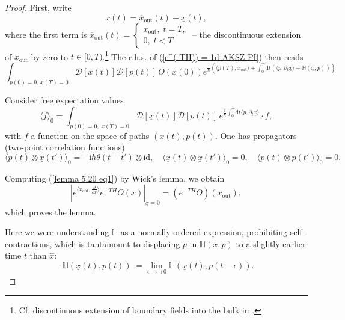 \documentclass{amsart}
\theoremstyle{plain} %
\theoremstyle{definition}
\theoremstyle{remark}
\newcommand{\mc}{\mathcal}
\newcommand{\mr}{\mathrm}
\newcommand{\ra}{\rightarrow}
\newcommand{\wh}{\widehat}
\newcommand{\dd}{\partial}
\newcommand{\iii}{\mathrm{i}}
\newcommand{\ol}{\overline}
\newcommand{\xx}{\underline{x}}
\newcommand{\dr}{\mathrm{d}}
\begin{document}
\begin{proof}
First, write 
\begin{equation}\label{x=xout+xhat}
x(t)=\ol{x}_\mr{out}(t)+\xx(t),
\end{equation}
where the first term is 
$\ol{x}_\mr{out}(t)=\begin{cases}
    x_\mr{out},\; t=T,\\
    0,\; t<T
\end{cases}$
-- the discontinuous extension of $x_\mr{out}$ by zero to $t\in [0,T)$.\footnote{Cf. discontinuous extension of boundary fields into the bulk in \cite[Section 2.4]{CMRpert}.
} The r.h.s. of (\ref{e^(-TH)) = 1d AKSZ PI}) then reads
\begin{equation}\label{lemma 5.20 eq1}
    \int_{p(0)=0, \, \xx(T)=0} \mc{D} [\xx(t)] \mc{D} [p(t)]\, O(\xx(0)) e^{\frac{\iii}{\hbar} \left(\langle p(T),x_\mr{out} \rangle+\int_0^T \dr t \left(\langle p,\dd_t \xx \rangle-\mathbb{H}(\xx,p)\right) \right)}
\end{equation}

Consider free expectation values 
\begin{equation}
        \langle f \rangle_0 = \int_{p(0)=0,\; \xx(T)=0} 
        \mc{D} [\xx(t)] \mc{D} [p(t)]\, e^{\frac{\iii}{\hbar}\int_0^T \dr t \langle p, \dd_t \xx\rangle}\cdot f,
\end{equation}
with $f$ a function on the space of paths $(\xx(t),p(t))$. %
One has propagators (two-point correlation functions)
\begin{equation}
        \langle p(t)\otimes \xx(t') \rangle_0=-\iii\hbar \theta(t-t')\otimes\mr{id},\quad
        \langle \xx(t)\otimes \xx(t')\rangle_0 = 0,\quad
        \langle p(t)\otimes p(t')\rangle_0 =0.
\end{equation}

Computing (\ref{lemma 5.20 eq1}) by Wick's lemma, we obtain
\begin{equation}
    \left| e^{\langle x_\mr{out}, \frac{\dd}{\dd \xx}\rangle} e^{-T H} O(\xx)  \right|_{\xx=0} = (e^{-TH}O)(x_\mr{out}),
\end{equation}
which proves the lemma.

Here we were understanding $\mathbb{H}$ as a normally-ordered expression, prohibiting self-contractions, which is tantamount to displacing $p$ in $\mathbb{H}(\xx,p)$ to a slightly earlier time $t$ than $\wh{x}$: 
\begin{equation}
:\mathbb{H}(\xx(t),p(t)):=\lim_{\epsilon\ra +0} \mathbb{H}(\xx(t),p(t-\epsilon)).
\end{equation}
\end{proof}
\end{document}
